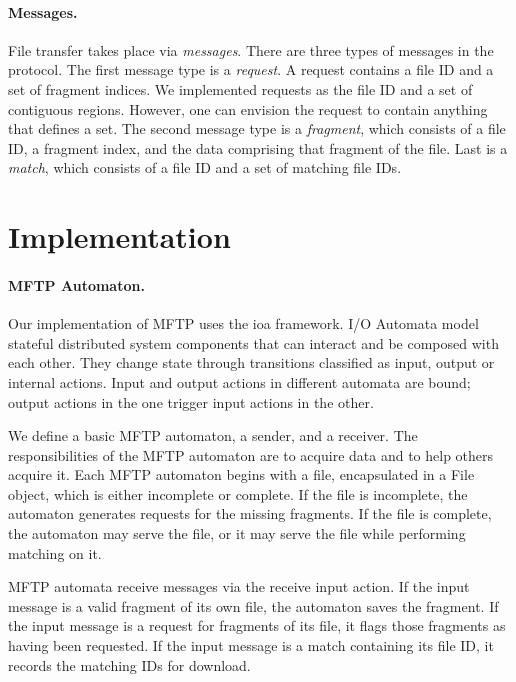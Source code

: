 \documentclass[letterpaper]{article}
\begin{document}
\paragraph{Messages.}
File transfer takes place via \emph{messages}.
There are three types of messages in the protocol.
The first message type is a \emph{request}.
A request contains a file ID and a set of fragment indices.
We implemented requests as the file ID and a set of contiguous regions.  
However, one can envision the request to contain anything that defines a set.
The second message type is a \emph{fragment}, which consists of a file ID, a fragment index, and the data comprising that fragment of the file.
Last is a \emph{match}, which consists of a file ID and a set of matching file IDs.



\section{Implementation}


\paragraph{MFTP Automaton.}
Our implementation of MFTP uses the ioa framework.
I/O Automata model stateful distributed system components that can interact and be composed with each other.
They change state through transitions classified as input, output or internal actions.
Input and output actions in different automata are bound; output actions in the one trigger input actions in the other.

We define a basic MFTP automaton, a sender, and a receiver.
The responsibilities of the MFTP automaton are to acquire data and to help others acquire it.
Each MFTP automaton begins with a file, encapsulated in a File object, which is either incomplete or complete.
If the file is incomplete, the automaton generates requests for the missing fragments.
If the file is complete, the automaton may serve the file, or it may serve the file while performing matching on it.


MFTP automata receive messages via the receive input action.
If the input message is a valid fragment of its own file, the automaton saves the fragment.
If the input message is a request for fragments of its file, it flags those fragments as having been requested.
If the input message is a match containing its file ID, it records the matching IDs for download.
\end{document}
